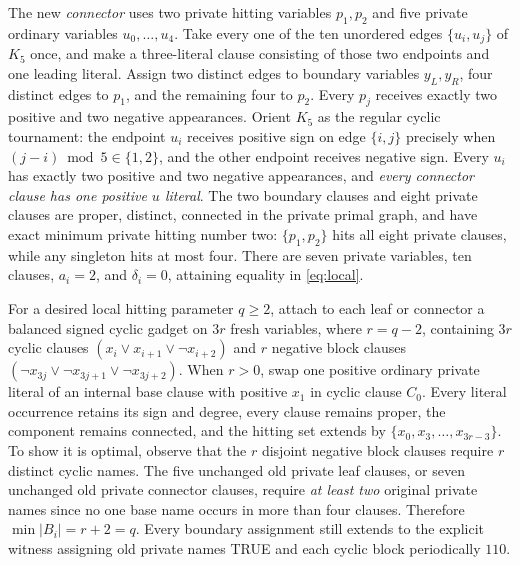\documentclass[11pt]{article}
\begin{document}
The new \emph{connector} uses two private hitting variables $p_1,p_2$ and five private ordinary variables $u_0,\ldots,u_4$. Take every one of the ten unordered edges $\{u_i,u_j\}$ of $K_5$ once, and make a three-literal clause consisting of those two endpoints and one leading literal. Assign two distinct edges to boundary variables $y_L,y_R$, four distinct edges to $p_1$, and the remaining four to $p_2$. Every $p_j$ receives exactly two positive and two negative appearances. Orient $K_5$ as the regular cyclic tournament: the endpoint $u_i$ receives positive sign on edge $\{i,j\}$ precisely when $(j-i)\bmod5\in\{1,2\}$, and the other endpoint receives negative sign. Every $u_i$ has exactly two positive and two negative appearances, and \emph{every connector clause has one positive $u$ literal}. The two boundary clauses and eight private clauses are proper, distinct, connected in the private primal graph, and have exact minimum private hitting number two: $\{p_1,p_2\}$ hits all eight private clauses, while any singleton hits at most four. There are seven private variables, ten clauses, $a_i=2$, and $\delta_i=0$, attaining equality in \eqref{eq:local}.

For a desired local hitting parameter $q\ge2$, attach to each leaf or connector a balanced signed cyclic gadget on $3r$ fresh variables, where $r=q-2$, containing $3r$ cyclic clauses $(x_i\vee x_{i+1}\vee\neg x_{i+2})$ and $r$ negative block clauses $(\neg x_{3j}\vee\neg x_{3j+1}\vee\neg x_{3j+2})$. When $r>0$, swap one positive ordinary private literal of an internal base clause with positive $x_1$ in cyclic clause $C_0$. Every literal occurrence retains its sign and degree, every clause remains proper, the component remains connected, and the hitting set extends by $\{x_0,x_3,\ldots,x_{3r-3}\}$. To show it is optimal, observe that the $r$ disjoint negative block clauses require $r$ distinct cyclic names. The five unchanged old private leaf clauses, or seven unchanged old private connector clauses, require \emph{at least two} original private names since no one base name occurs in more than four clauses. Therefore $\min|B_i|=r+2=q$. Every boundary assignment still extends to the explicit witness assigning old private names TRUE and each cyclic block periodically $110$.
\end{document}
